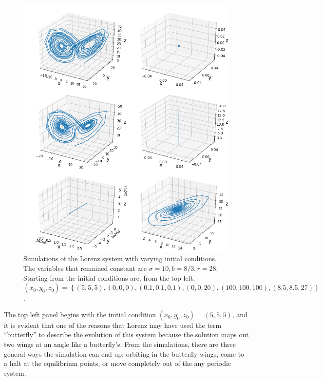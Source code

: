 \documentclass[twocolumn]{article}
\begin{document}
\begin{figure}
  \includegraphics[width=\linewidth]{sims1.png}
  \caption{
    Simulations of the Lorenz system with varying initial conditions. The
    variables that remained constant are $\sigma=10, b=8/3, r=28$. Starting from
    the initial conditions are, from the top left, $(x_0, y_0, z_0) = \left\{
    (5, 5, 5), (0, 0, 0), (0.1, 0.1, 0.1), (0, 0, 20), (100, 100, 100), (8.5,
    8.5, 27) \right\}$.
  }
  \label{fig:sims_init}
\end{figure}

The top left panel begins with the initial condition $(x_0, y_0, z_0) = (5, 5,
5)$, and it is evident that one of the reasons that Lorenz may have used the
term ``butterfly'' to describe the evolution of this system because the solution
maps out two wings at an angle like a butterfly's. From the simulations, there
are three general ways the simulation can end up: orbiting in the butterfly
wings, come to a halt at the equilibrium points, or move completely out of the
any periodic system.
\end{document}
